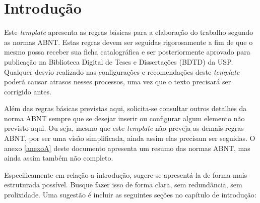 \documentclass[
	12pt,				%
	oneside,			%
	a4paper,			%
	english,			%
	brazil				%
	]{abntex2ppgsi}
\begin{document}
\tableofcontents*
\cleardoublepage



\textual



% 
%
%
\chapter{Introdução}
Este \textit{template} apresenta as regras básicas para a elaboração do trabalho segundo as normas ABNT. Estas regras devem ser seguidas rigorosamente a fim de que o mesmo possa receber sua ficha catalográfica e ser posteriormente aprovado para publicação na Biblioteca Digital de Teses e Dissertações (BDTD) da USP. Qualquer desvio realizado nas configurações e recomendações deste \textit{template} poderá causar atrasos nesses processos, uma vez que o texto precisará ser corrigido antes. 

Além das regras básicas previstas aqui, solicita-se consultar outros detalhes da norma ABNT sempre que se desejar inserir ou configurar algum elemento não previsto aqui. Ou seja, mesmo que este \textit{template} não preveja as demais regras ABNT, por ser uma visão simplificada, ainda assim elas precisam ser seguidas. O anexo \ref{anexoA} deste documento apresenta um resumo das normas ABNT, mas ainda assim também não completo.



Especificamente em relação a introdução, sugere-se apresentá-la de forma mais estruturada possível. Busque fazer isso de forma clara, sem redundância, sem prolixidade. Uma sugestão é incluir as seguintes seções no capítulo de introdução:
\end{document}

